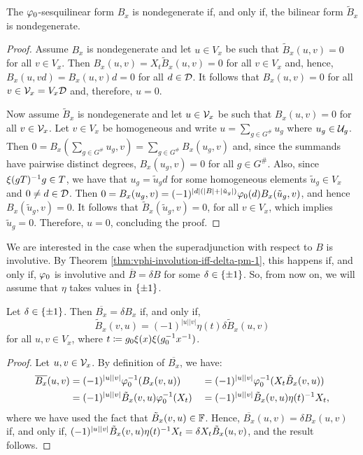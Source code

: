 \begin{lemma}\label{lemma:B_x-nondeg}
    The $\varphi_0$-sesquilinear form $B_x$ is nondegenerate if, and only if, the bilinear form $\tilde{B}_x$ is nondegenerate.
\end{lemma}

\begin{proof}
    Assume $B_x$ is nondegenerate and let $u \in V_x$ be such that $\tilde{B}_x(u,v) = 0$ for all $v \in V_x$. 
    Then $B_x(u, v) = X_{t} \tilde{B}_x(u,v) = 0$ for all $v \in V_x$ and, hence, $B_x(u, vd) = B_x(u, v)d = 0$ for all $d \in \mathcal{D}$. 
    It follows that $B_x(u,v) = 0$ for all $v\in \mathcal V_x = V_x \mathcal{D}$ and, therefore, $u = 0$.
    
    Now assume $\tilde{B}_x$ is nondegenerate and let $u \in \mathcal V_x$ be such that $B_x (u,v) = 0$ for all $v \in \mathcal V_x$.
    Let $v\in V_x$ be homogeneous and write $u = \sum_{g\in G^\#} u_g$ where $u_g \in \mathcal U_g$. 
    Then $0 = B_x(\sum_{g\in G^\#} u_g, v) = \sum_{g\in G^\#} B_x(u_g, v)$ and, since the summands have pairwise distinct degrees, $B_x(u_g, v) = 0$ for all $g\in G^\#$. 
    Also, since $\xi(gT)^{-1} g \in T$, we have that $u_g = \tilde u_g d$ for some homogeneous elements $\tilde u_g \in V_x$ and $0 \neq d \in \mathcal{D}$. 
    Then $0 = B_x(u_g, v) = (-1)^{|d|(|B| + |\tilde u_g|)} \varphi_0(d) B_x(\tilde u_g, v)$, and hence $B_x(\tilde u_g, v) = 0$. 
    It follows that $\tilde{B}_x(\tilde u_g, v) = 0$, for all $v\in V_x$, which implies $\tilde u_g = 0$. 
    Therefore, $u = 0$, concluding the proof.
\end{proof}

We are interested in the case when the superadjunction with respect to $B$ is involutive. 
By Theorem \ref{thm:vphi-involution-iff-delta-pm-1}, this happens if, and only if, $\varphi_0$ is involutive and $\overline B = \delta B$ for some $\delta \in \{ \pm 1 \}$. 
So, from now on, we will assume that $\eta$ takes values in $\{ \pm 1 \}$. 

\begin{lemma}\label{lemma:B_x-delta}
    Let $\delta \in \{ \pm 1 \}$. 
    Then $\overline{B_x} = \delta B_x$ if, and only if, 
    \[
        \tilde{B}_x (v, u) = (-1)^{|u| |v|} \eta(t) \delta \tilde{B}_x (u, v)
    \]
    for all $u, v \in V_x$, where $t \coloneqq g_0 \xi(x) \xi(g_0^{-1} x^{-1})$.
\end{lemma}

\begin{proof}
    Let $u,v \in \mathcal V_x$. 
    By definition of $\overline{B_x}$, we have:
    \begin{alignat*}{3}
        \overline{B_x} (u, v) &= (-1)^{|u||v|} \varphi_0^{-1}( B_x(v, u) )
        &&= (-1)^{|u||v|} \varphi_0^{-1}( X_t \tilde{B}_x(v, u) )\\
        &= (-1)^{|u||v|} \tilde{B}_x(v, u) \varphi_0^{-1}(X_t)
        &&= (-1)^{|u||v|} \tilde{B}_x(v, u) \eta(t)^{-1} X_t,
    \end{alignat*}
    where we have used the fact that $\tilde B_x (v, u) \in \mathbb{F}$.
    Hence, $\overline{B_x} (u, v) = \delta {B_x} (u, v)$ if, and only if,
    $(-1)^{|u||v|} \tilde{B}_x(v, u) \eta(t)^{-1} X_t = \delta X_t \tilde{B}_x(u, v)$, and the result follows.
\end{proof}

